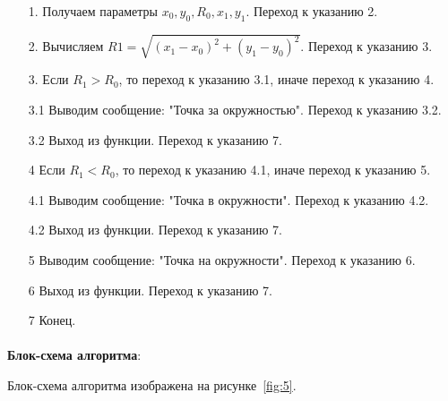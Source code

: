 \documentclass[12pt, a4paper, simple]{eskdtext}
\begin{document}
\begin{enumerate}
    \item[1.] Получаем параметры $x_0, y_0, R_0, x_1, y_1$. Переход к указанию 2.
    \item[2.] Вычисляем $R1 = \sqrt{(x_1 - x_0)^2 + (y_1 - y_0)^2}$. Переход к указанию 3.
    \item[3.] Если $R_1 > R_0$, то переход к указанию 3.1, иначе переход к указанию 4.
    \item[3.1] Выводим сообщение: "Точка за окружностью". Переход к указанию 3.2.
    \item[3.2] Выход из функции. Переход к указанию 7.
    \item[4] Если $R_1 < R_0$, то переход к указанию 4.1, иначе переход к указанию 5.
    \item[4.1] Выводим сообщение: "Точка в окружности". Переход к указанию 4.2.
    \item[4.2] Выход из функции. Переход к указанию 7.
    \item[5] Выводим сообщение: "Точка на окружности". Переход к указанию 6.
    \item[6] Выход из функции. Переход к указанию 7.
    \item[7] Конец.
\end{enumerate}

\paragraph{} \textbf{Блок-схема алгоритма}:

Блок-схема алгоритма изображена на рисунке~\ref{fig:5}.
\end{document}
